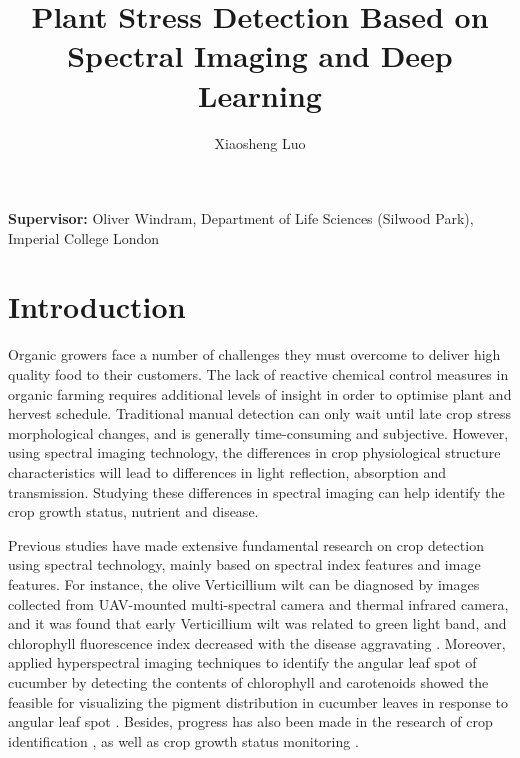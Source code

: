 \documentclass[11pt]{article}
\title{\textbf{Plant Stress Detection Based on Spectral Imaging and Deep Learning}}
\author[]{Xiaosheng Luo}
\affil[]{Imperial College London}
\date{}
\begin{document}
  \maketitle

\section*{}
\begin{center}
	\textbf{Supervisor:} Oliver Windram, Department of Life Sciences (Silwood Park), Imperial College London
\end{center}


\newpage
\section*{Introduction}
\begin{linenumbers}
Organic growers face a number of challenges they must overcome to deliver high quality food to their customers. The lack of reactive chemical control measures in organic farming requires additional levels of insight in order to optimise plant and hervest schedule. Traditional manual detection can only wait until late crop stress morphological changes, and is generally time-consuming and subjective. However, using spectral imaging technology, the differences in crop physiological structure characteristics will lead to differences in light reflection, absorption and transmission. Studying these differences in spectral imaging can help identify the crop growth status, nutrient and disease.

Previous studies have made extensive fundamental research on crop detection using spectral technology, mainly based on spectral index features and image features. For instance, the olive Verticillium wilt can be diagnosed by images collected from UAV-mounted multi-spectral camera and thermal infrared camera, and it was found that early Verticillium wilt was related to green light band, and chlorophyll fluorescence index decreased with the disease aggravating \citep{calderon2013high}. Moreover, applied hyperspectral imaging techniques to identify the angular leaf spot of cucumber by detecting the contents of chlorophyll and carotenoids showed the feasible for visualizing the pigment distribution in cucumber leaves in response to angular leaf spot \citep{zhao2016hyperspectral}. Besides, progress has also been made in the research of crop identification \citep{torres2013imagery,laliberte2009texture}, as well as crop growth status monitoring \citep{vega2015multi}.


\end{linenumbers}
\end{document}
